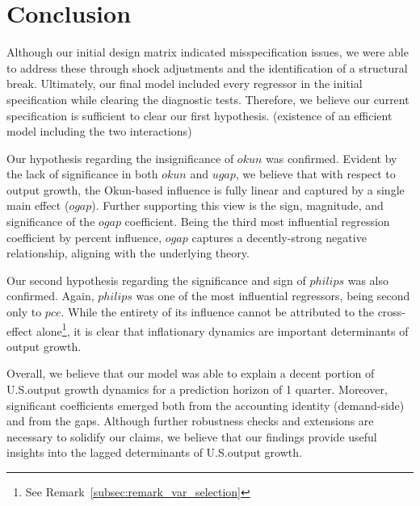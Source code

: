 \section{Conclusion}\label{sec:conclusion}
Although our initial design matrix indicated misspecification issues, we were able to address these through shock adjustments and the identification of a structural break.
Ultimately, our final model included every regressor in the initial specification while clearing the diagnostic tests.
Therefore, we believe our current specification is sufficient to clear our first hypothesis. (existence of an efficient model including the two interactions)

\vspace{\baselineskip}

Our hypothesis regarding the insignificance of $okun$ was confirmed. 
Evident by the lack of significance in both $okun$ and $ugap$, we believe that with respect to output growth, the Okun-based influence is fully linear and captured by a single main effect ($ogap$).
Further supporting this view is the sign, magnitude, and significance of the $ogap$ coefficient.
Being the third most influential regression coefficient by percent influence, $ogap$ captures a decently-strong negative relationship, aligning with the underlying theory.

\vspace{\baselineskip}

Our second hypothesis regarding the significance and sign of $philips$ was also confirmed.
Again, $philips$ was one of the most influential regressors, being second only to $pce$.
While the entirety of its influence cannot be attributed to the cross-effect alone\footnote{See Remark~\ref{subsec:remark_var_selection}}, it is clear that inflationary dynamics are important determinants of output growth.

\vspace{\baselineskip}

Overall, we believe that our model was able to explain a decent portion of U.S.\@ output growth dynamics for a prediction horizon of 1 quarter.
Moreover, significant coefficients emerged both from the accounting identity (demand-side) and from the gaps.
Although further robustness checks and extensions are necessary to solidify our claims, we believe that our findings provide useful insights into the lagged determinants of U.S.\@ output growth. 